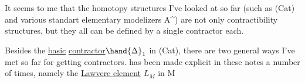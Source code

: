 It seems to me that the homotopy structures I've looked at so far
(such as (Cat) and various standart elementary modelizers A\^{}) are not only
contractibility structures,  but they  all can be defined by a single
contractor each.

Besides the \uline{basic} \uline{contractor}$\hand{\Delta}_1$ in (Cat),  there are two general ways
I've met so far for getting contractors.    has been made explicit in
these notes a number of times,  namely the \uline{Lawvere element}  $L_M$  in M

